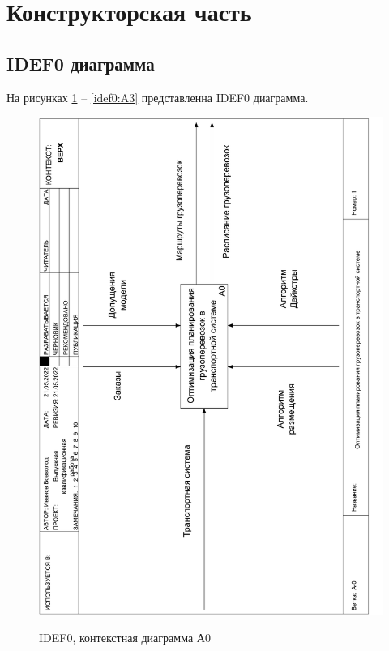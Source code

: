 \section{Конструкторская часть}
\subsection{IDEF0 диаграмма}
На рисунках \ref{idef0:top} -- \ref{idef0:A3} представленна IDEF0 диаграмма.

\begin{figure}[h]
	\begin{center}
		{\includegraphics[scale=0.63, angle=-90, page=1]{img/idef0.pdf}}
		\caption{IDEF0, контекстная диаграмма А0}
		\label{idef0:top}
	\end{center}
\end{figure}

